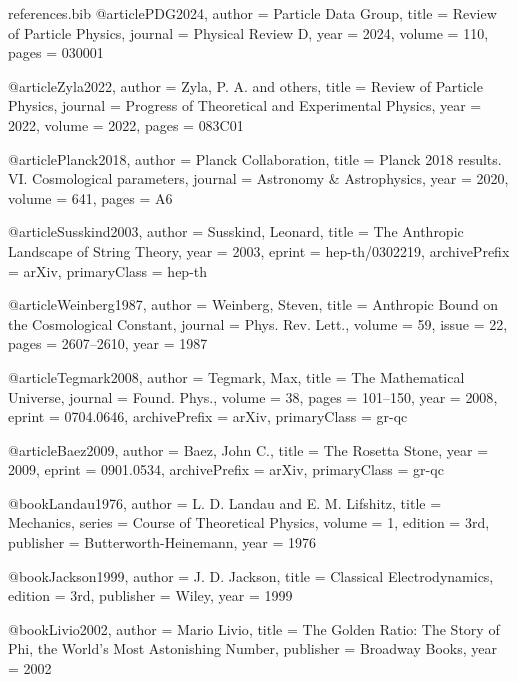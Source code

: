 \begin{filecontents}{references.bib}
@article{PDG2024,
  author = {{Particle Data Group}},
  title = {Review of Particle Physics},
  journal = {Physical Review D},
  year = {2024},
  volume = {110},
  pages = {030001}
}

@article{Zyla2022,
  author = {Zyla, P. A. and others},
  title = {Review of Particle Physics},
  journal = {Progress of Theoretical and Experimental Physics},
  year = {2022},
  volume = {2022},
  pages = {083C01}
}

@article{Planck2018,
  author = {{Planck Collaboration}},
  title = {Planck 2018 results. VI. Cosmological parameters},
  journal = {Astronomy \& Astrophysics},
  year = {2020},
  volume = {641},
  pages = {A6}
}

@article{Susskind2003,
  author        = {Susskind, Leonard},
  title         = {{The Anthropic Landscape of String Theory}},
  year          = {2003},
  eprint        = {hep-th/0302219},
  archivePrefix = {arXiv},
  primaryClass  = {hep-th}
}

@article{Weinberg1987,
  author  = {Weinberg, Steven},
  title   = {Anthropic Bound on the Cosmological Constant},
  journal = {Phys. Rev. Lett.},
  volume  = {59},
  issue   = {22},
  pages   = {2607--2610},
  year    = {1987}
}

@article{Tegmark2008,
  author  = {Tegmark, Max},
  title   = {{The Mathematical Universe}},
  journal = {Found. Phys.},
  volume  = {38},
  pages   = {101--150},
  year    = {2008},
  eprint  = {0704.0646},
  archivePrefix = {arXiv},
  primaryClass = {gr-qc}
}

@article{Baez2009,
  author = {Baez, John C.},
  title = {{The Rosetta Stone}},
  year = {2009},
  eprint = {0901.0534},
  archivePrefix = {arXiv},
  primaryClass = {gr-qc}
}

@book{Landau1976,
  author    = {L. D. Landau and E. M. Lifshitz},
  title     = {Mechanics},
  series    = {Course of Theoretical Physics},
  volume    = {1},
  edition   = {3rd},
  publisher = {Butterworth-Heinemann},
  year      = {1976}
}

@book{Jackson1999,
  author    = {J. D. Jackson},
  title     = {Classical Electrodynamics},
  edition   = {3rd},
  publisher = {Wiley},
  year      = {1999}
}

@book{Livio2002,
  author    = {Mario Livio},
  title     = {The Golden Ratio: The Story of Phi, the World's Most Astonishing Number},
  publisher = {Broadway Books},
  year      = {2002}
}


\end{filecontents}

